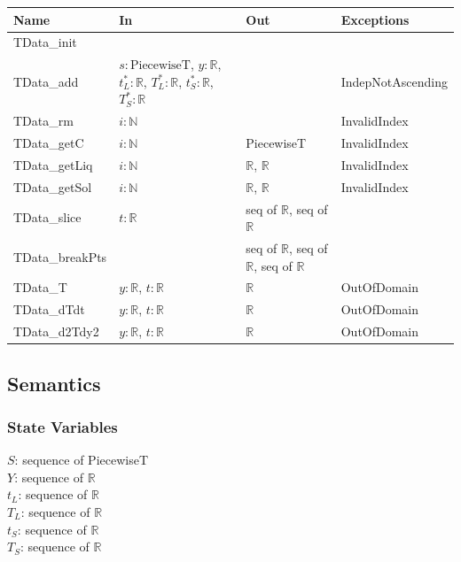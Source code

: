 \documentclass[12pt, titlepage]{article}
\begin{document}
\begin{center}
\begin{tabular}{p{3cm} p{5cm} p{5cm} p{3.5cm}}
\toprule
\textbf{Name} & \textbf{In} & \textbf{Out} & \textbf{Exceptions} \\
\midrule
TData\_init & & ~ & ~ \\
TData\_add & $s: \mbox{PiecewiseT}$, $y: \mathbb{R}$, $t^*_L: \mathbb{R}$, $T^*_L:
             \mathbb{R}$, $t^*_S: \mathbb{R}$, $T^*_S: \mathbb{R}$ & ~ & IndepNotAscending\\
TData\_rm & $i: \mathbb{N}$ &  & InvalidIndex\\
TData\_getC & $i: \mathbb{N}$ & PiecewiseT & InvalidIndex\\
TData\_getLiq & $i: \mathbb{N}$ & $\mathbb{R}$, $\mathbb{R}$ & InvalidIndex\\
TData\_getSol & $i: \mathbb{N}$ & $\mathbb{R}$, $\mathbb{R}$ & InvalidIndex\\
TData\_slice & $t: \mathbb{R}$ & seq of $\mathbb{R}$, seq of $\mathbb{R}$ & ~\\
TData\_breakPts &  & seq of $\mathbb{R}$, seq of $\mathbb{R}$, seq of $\mathbb{R}$ & ~\\
TData\_T &  $y: \mathbb{R}$, $t: \mathbb{R}$ & $\mathbb{R}$ & OutOfDomain\\
TData\_dTdt &  $y: \mathbb{R}$, $t: \mathbb{R}$ & $\mathbb{R}$ & OutOfDomain\\
TData\_d2Tdy2  &   $y: \mathbb{R}$, $t: \mathbb{R}$ & $\mathbb{R}$ & OutOfDomain\\
\bottomrule
\end{tabular}
\end{center}

\subsection{Semantics}

\subsubsection{State Variables}

$S$: sequence of PiecewiseT\\ 
$Y$: sequence of $\mathbb{R}$\\
$t_L$: sequence of $\mathbb{R}$\\
$T_L$: sequence of $\mathbb{R}$\\
$t_S$: sequence of $\mathbb{R}$\\
$T_S$: sequence of $\mathbb{R}$
\end{document}
